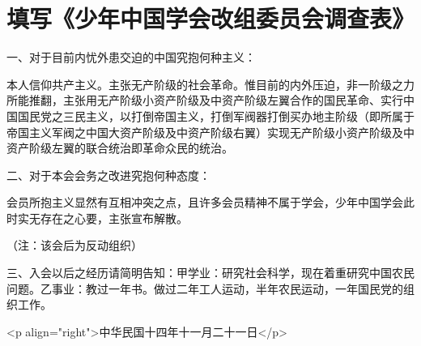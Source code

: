 \section[填写《少年中国学会改组委员会调查表》（一九二五年十一月二十一日）]{填写《少年中国学会改组委员会调查表》}


一、对于目前内忧外患交迫的中国究抱何种主义：

本人信仰共产主义。主张无产阶级的社会革命。惟目前的内外压迫，非一阶级之力所能推翻，主张用无产阶级小资产阶级及中资产阶级左翼合作的国民革命、实行中国国民党之三民主义，以打倒帝国主义，打倒军阀器打倒买办地主阶级（即所属于帝国主义军阀之中国大资产阶级及中资产阶级右翼）实现无产阶级小资产阶级及中资产阶级左翼的联合统治即革命众民的统治。

二、对于本会会务之改进究抱何种态度：

会员所抱主义显然有互相冲突之点，且许多会员精神不属于学会，少年中国学会此时实无存在之心要，主张宣布解散。

（注：该会后为反动组织）

三、入会以后之经历请简明告知：甲学业：研究社会科学，现在着重研究中国农民问题。乙事业：教过一年书。做过二年工人运动，半年农民运动，一年国民党的组织工作。

<p align="right">中华民国十四年十一月二十一日</p>

